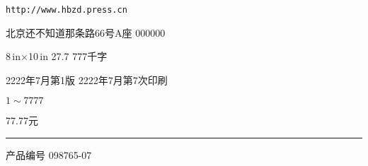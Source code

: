 {\vspace{0.5em}
\noindent\sj[4.7]\begin{minipage}{0.8\linewidth}
     \texttt{http://www.hbzd.press.cn}  \par
     北京还不知道那条路66号A座 \qquad {} 000000 \par
        \par
\end{minipage}

\vspace{0.5em}
\noindent{} \par
\noindent{} \par
\noindent{} \par
\noindent{} 8\,\si{in}$\times$10\,\si{in}\qquad {} 27.7 \qquad {}  777千字\par
\noindent{} 2222年7月第1版 \qquad {} 2222年7月第7次印刷\par
\noindent{} $1\sim 7777$\par
\noindent{} 77.77元 \par
\noindent\rule[1em]{\linewidth}{0.1pt}\par
\vspace{-1.5em}
\noindent 产品编号\hc{:} 098765-07
}
\newpage
\restoregeometry